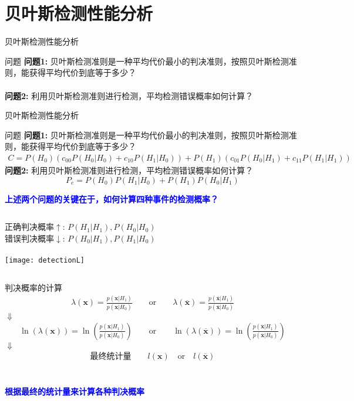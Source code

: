 \section{贝叶斯检测性能分析}

\begin{frame}{贝叶斯检测性能分析}
\begin{block}{问题}
	\textbf{问题1:} 贝叶斯检测准则是一种平均代价最小的判决准则，按照贝叶斯检测准则，能获得平均代价到底等于多少？\\
	~\\
	\textbf{问题2:} 利用贝叶斯检测准则进行检测，平均检测错误概率如何计算？
\end{block}
\end{frame}

\begin{frame}{贝叶斯检测性能分析}
\begin{block}{问题}
	\textbf{问题1:} 贝叶斯检测准则是一种平均代价最小的判决准则，按照贝叶斯检测准则，能获得平均代价到底等于多少？
	\begin{align*}
	C=P(H_0)(c_{00}P(H_0|H_0)+c_{10}P(H_1|H_0))+P(H_1)(c_{01}P(H_0|H_1)+c_{11}P(H_1|H_1))
	\end{align*}
	\textbf{问题2:} 利用贝叶斯检测准则进行检测，平均检测错误概率如何计算？
	\[P_e=P(H_0)P(H_1|H_0)+P(H_1)P(H_0|H_1)\]
\end{block}
\textbf{\textcolor{blue}{上述两个问题的关键在于，如何计算四种事件的检测概率？}}
\begin{columns}
	正确判决概率$\uparrow$: $P(H_1|H_1), P(H_0|H_0)$\\
	错误判决概率$\downarrow$: $P(H_0|H_1), P(H_1|H_0)$\\
	~\\
	\texttt{[image: detectionL]}
\end{columns}
\end{frame}

\begin{frame}{判决概率的计算}
\begin{align*}
\lambda(\bm{x})=\frac{p(\bm{x}|H_1)}{p(\bm{x}|H_0)}\qquad \text{or}\qquad \lambda(\bm{\overline{x}})=\frac{p(\bm{\overline{x}}|H_1)}{p(\bm{\overline{x}}|H_0)}
\end{align*}
\centering $\Downarrow$
\begin{align*}
\ln(\lambda(\bm{x}))=\ln\left(\frac{p(\bm{x}|H_1)}{p(\bm{x}|H_0)}\right)\qquad \text{or}\qquad \ln(\lambda(\bm{\overline{x}}))=\ln\left(\frac{p(\bm{\overline{x}}|H_1)}{p(\bm{\overline{x}}|H_0)}\right)
\end{align*}
\centering $\Downarrow$
\begin{align*}
\textbf{最终统计量}\qquad l(\bm{x})\quad \text{or}\quad l(\bm{\overline{x}})
\end{align*}\\
~\\
\textbf{\textcolor{blue}{根据最终的统计量来计算各种判决概率}}
\end{frame}

